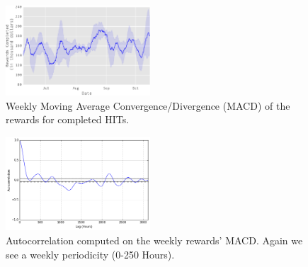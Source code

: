 \begin{figure}[tb]
	\centering
		\includegraphics[width=0.48\textwidth]{figures/mac}
	\caption{Weekly Moving Average Convergence/Divergence (MACD) of the rewards for completed HITs.}
	\label{fig:mac}
\end{figure}
\begin{figure}[tb]
	\centering
		\includegraphics[width=0.48\textwidth]{figures/autocorrelation2}
	\caption{Autocorrelation computed on the weekly rewards' MACD. Again we see a weekly periodicity (0-250 Hours).}
	\label{fig:autocorrelation2}
\end{figure}